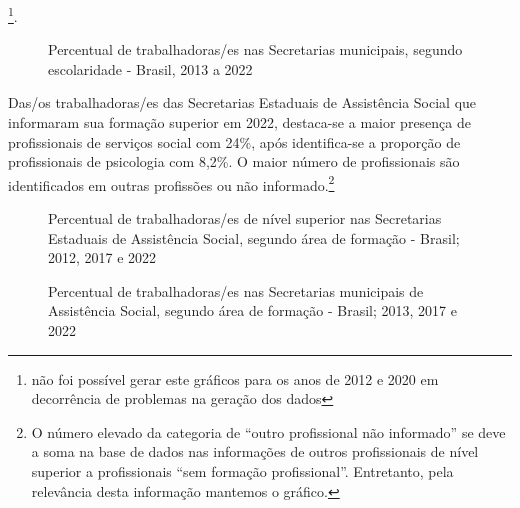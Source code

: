 \documentclass[
  letterpaper,
  DIV=11,
  numbers=noendperiod]{scrreprt}
\begin{document}
\footnote{não foi possível gerar este gráficos para os anos de 2012 e
  2020 em decorrência de problemas na geração dos dados}.

\begin{figure}


\caption{\label{fig-munic_trab_form}Percentual de trabalhadoras/es nas
Secretarias municipais, segundo escolaridade - Brasil, 2013 a 2022}

\end{figure}%

Das/os trabalhadoras/es das Secretarias Estaduais de Assistência Social
que informaram sua formação superior em 2022, destaca-se a maior
presença de profissionais de serviços social com 24\%, após
identifica-se a proporção de profissionais de psicologia com 8,2\%. O
maior número de profissionais são identificados em outras profissões ou
não informado.\footnote{O número elevado da categoria de ``outro
  profissional não informado'' se deve a soma na base de dados nas
  informações de outros profissionais de nível superior a profissionais
  ``sem formação profissional''. Entretanto, pela relevância desta
  informação mantemos o gráfico.}

\begin{figure}


\caption{\label{fig-uf_trab_prof}Percentual de trabalhadoras/es de nível
superior nas Secretarias Estaduais de Assistência Social, segundo área
de formação - Brasil; 2012, 2017 e 2022}

\end{figure}%

\begin{figure}


\caption{\label{fig-munic_trab_prof}Percentual de trabalhadoras/es nas
Secretarias municipais de Assistência Social, segundo área de formação -
Brasil; 2013, 2017 e 2022}

\end{figure}%
\end{document}
